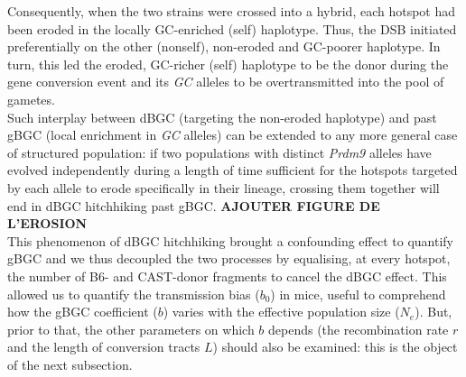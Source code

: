 Consequently, when the two strains were crossed into a hybrid, each hotspot had been eroded in the locally GC-enriched (self) haplotype. 
Thus, the DSB initiated preferentially on the other (nonself), non-eroded and GC-poorer haplotype.
In turn, this led the eroded, GC-richer (self) haplotype to be the donor during the gene conversion event and its \textit{GC} alleles to be overtransmitted into the pool of gametes.\\

Such interplay between dBGC (targeting the non-eroded haplotype) and past gBGC (local enrichment in \textit{GC} alleles) can be extended to any more general case of structured population:
if two populations with distinct \textit{Prdm9} alleles have evolved independently during a length of time sufficient for the hotspots targeted by each allele to erode specifically in their lineage, crossing them together will end in dBGC hitchhiking past gBGC\@. 
\textbf{AJOUTER FIGURE DE L'EROSION}\\

%


This phenomenon of dBGC hitchhiking brought a confounding effect to quantify gBGC and we thus decoupled the two processes by equalising, at every hotspot, the number of B6- and CAST-donor fragments to cancel the dBGC effect.
This allowed us to quantify the transmission bias ($b_0$) in mice, useful to comprehend how the gBGC coefficient ($b$) varies with the effective population size ($N_e$).
But, prior to that, the other parameters on which $b$ depends (the recombination rate $r$ and the length of conversion tracts $L$) should also be examined: this is the object of the next subsection.
 




